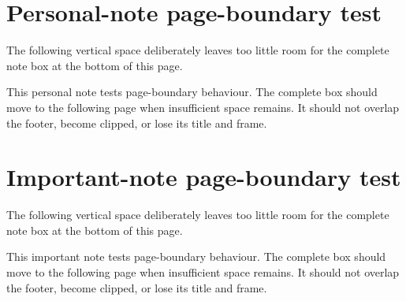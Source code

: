\documentclass{studentnotes}
\begin{document}
\clearpage
\section{Personal-note page-boundary test}

The following vertical space deliberately leaves too little room for
the complete note box at the bottom of this page.

\rule{0pt}{0.78\textheight}

\begin{personalnote}
    This personal note tests page-boundary behaviour. The complete box
    should move to the following page when insufficient space remains.
    It should not overlap the footer, become clipped, or lose its title
    and frame.
\end{personalnote}

\clearpage
\section{Important-note page-boundary test}

The following vertical space deliberately leaves too little room for
the complete note box at the bottom of this page.

\rule{0pt}{0.78\textheight}

\begin{importantnote}
    This important note tests page-boundary behaviour. The complete box
    should move to the following page when insufficient space remains.
    It should not overlap the footer, become clipped, or lose its title
    and frame.
\end{importantnote}
\end{document}
